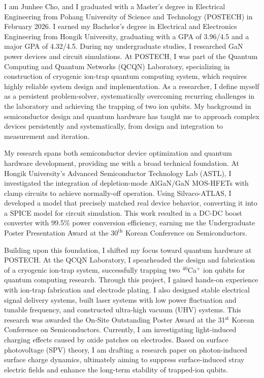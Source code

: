 \documentclass[11pt, a4paper]{awesome-cv}
\begin{document}
\begin{cvletter}

    \color{darktext}
    I am Junhee Cho, and I graduated with a Master’s degree in Electrical Engineering from Pohang University of Science and Technology (POSTECH) in February 2026. I earned my Bachelor’s degree in Electrical and Electronics Engineering from Hongik University, graduating with a GPA of 3.96/4.5 and a major GPA of 4.32/4.5. During my undergraduate studies, I researched GaN power devices and circuit simulations. At POSTECH, I was part of the Quantum Computing and Quantum Networks (QCQN) Laboratory, specializing in construction of cryogenic ion-trap quantum computing system, which requires highly reliable system design and implementation. As a researcher, I define myself as a persistent problem-solver, systematically overcoming recurring challenges in the laboratory and achieving the trapping of two ion qubits. My background in semiconductor design and quantum hardware has taught me to approach complex devices persistently and systematically, from design and integration to measurement and iteration.
    
    \color{darktext}
    My research spans both semiconductor device optimization and quantum hardware development, providing me with a broad technical foundation. At Hongik University’s Advanced Semiconductor Technology Lab (ASTL), I investigated the integration of depletion-mode AlGaN/GaN MOS-HFETs with clamp circuits to achieve normally-off operation. Using Silvaco-ATLAS, I developed a model that precisely matched real device behavior, converting it into a SPICE model for circuit simulation. This work resulted in a DC-DC boost converter with 99.5\% power conversion efficiency, earning me the Undergraduate Poster Presentation Award at the $30^{\textrm{th}}$ Korean Conference on Semiconductors.
    
    Building upon this foundation, I shifted my focus toward quantum hardware at POSTECH. At the QCQN Laboratory, I spearheaded the design and fabrication of a cryogenic ion-trap system, successfully trapping two $^{40}$Ca$^{+}$ ion qubits for quantum computing research. Through this project, I gained hands-on experience with ion-trap fabrication and electrode plating. I also designed stable electrical signal delivery systems, built laser systems with low power fluctuation and tunable frequency, and constructed ultra-high vacuum (UHV) systems. This research was awarded the On-Site Outstanding Poster Award at the 31$^{\textrm{st}}$ Korean Conference on Semiconductors. Currently, I am investigating light-induced charging effects caused by oxide patches on electrodes. Based on surface photovoltage (SPV) theory, I am drafting a research paper on photon-induced surface charge dynamics, ultimately aiming to suppress surface-induced stray electric fields and enhance the long-term stability of trapped-ion qubits.
    

\end{cvletter}
\end{document}
